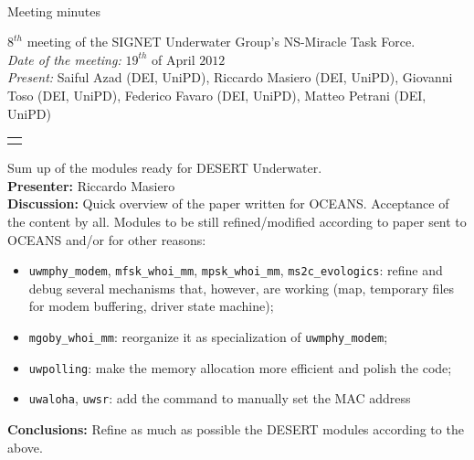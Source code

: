 \documentclass[11pt,journal,draftclsnofoot,onecolumn,twoside,letterpaper]{IEEEtran}
\theoremstyle{definition} \newtheorem{definition}[]{Definition}
\theoremstyle{theorem} \newtheorem{theorem}[]{Theorem}
\begin{document}
\pagestyle{empty}

\begin{Large} \\ \end{Large}
\begin{large} {Meeting minutes} \end{large}

\vspace{0.8cm}

 $8^{th}$ meeting of the SIGNET Underwater Group's NS-Miracle Task Force.\\
{\it Date of the meeting: } $19^{th}$ of April $2012$\\
{\it Present: } Saiful Azad (DEI, UniPD), Riccardo Masiero (DEI, UniPD), Giovanni Toso (DEI, UniPD), Federico Favaro (DEI, UniPD), Matteo Petrani (DEI, UniPD)\\

\vspace{0.5cm}

\begin{tabular}{p{}}
 \hline \\
\end{tabular}

 Sum up of the modules ready for DESERT Underwater.\\
{\bf Presenter:} Riccardo Masiero\\
{\bf Discussion:} Quick overview of the paper written for OCEANS. Acceptance of the content by all.
Modules to be still refined/modified according to paper sent to OCEANS and/or for other reasons:
\begin{itemize}
 \item {\tt uwmphy\_modem}, {\tt mfsk\_whoi\_mm}, {\tt mpsk\_whoi\_mm}, {\tt ms2c\_evologics}: refine and debug several mechanisms that, however, are working (map, temporary files for modem buffering, driver state machine);
 \item {\tt mgoby\_whoi\_mm}: reorganize it as specialization of {\tt uwmphy\_modem};
 \item {\tt uwpolling}: make the memory allocation more efficient and polish the code;
 \item {\tt uwaloha}, {\tt uwsr}: add the command to manually set the MAC address
\end{itemize}
{\bf Conclusions:}  Refine as much as possible the DESERT modules according to the above.
\end{document}
